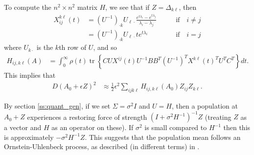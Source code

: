 \documentclass{article}
\newcommand{\tr}{\mathop{\mbox{tr}}} %
\newcommand{\1}{\mathbbm{1}}
\begin{document}
To compute the $n^2 \times n^2$ matrix $H$,
we see that if $Z=\Delta_{k \ell}$, then
\begin{equation}
  \begin{aligned}
      X_{ij}^{k\ell}(t) 
      &= 
      (U^{-1})_{\cdot k} U_{\ell \cdot}
      \frac{ e^{t \lambda_i} - e^{t \lambda_j} }{ \lambda_i - \lambda_j } 
          \qquad & \text{if} \quad i \neq j \\
      &=
      (U^{-1})_{\cdot k} U_{\ell \cdot}
      t e^{t \lambda_i} 
          \qquad & \text{if} \quad i = j 
  \end{aligned}
\end{equation}
where $U_{k \cdot}$ is the $k$th row of $U$,
and so
\begin{equation}
    \begin{aligned}
        H_{ij, k\ell}(A)
        &=
        \int_0^\infty
            \rho(t) \tr\left\{ C U X^{ij}(t) U^{-1} B B^T (U^{-1})^T X^{k\ell}(t)^T U^T C^T \right\}
        dt .
    \end{aligned}
\end{equation}
This implies that
\begin{equation}
    \begin{aligned}
        D(A_0+\epsilon Z)^2
        &\approx \frac{1}{2} \epsilon^2 \sum_{ijk\ell} H_{ij,k\ell}(A_0) Z_{ij} Z_{k\ell}  .
    \end{aligned}
\end{equation}

By section \ref{ss:quant_gen},
if we set $\Sigma=\sigma^2 I$ and $U=H$,
then a population at $A_0+Z$ experiences a restoring force of strength
$(I + \sigma^2 H^{-1})^{-1} Z$ (treating $Z$ as a vector and $H$ as an operator on these).
If $\sigma^2$ is small compared to $H^{-1}$
then this is approximately $-\sigma^2 H^{-1} Z$.
This suggests that the population mean follows an Ornstein-Uhlenbeck process,
as described (in different terms) in \citet{hansen1996translating}.
\end{document}
